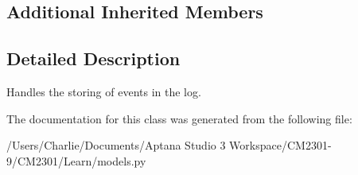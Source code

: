 \subsection*{Additional Inherited Members}


\subsection{Detailed Description}
Handles the storing of events in the log. 

The documentation for this class was generated from the following file\-:\begin{DoxyCompactItemize}
\item 
/\-Users/\-Charlie/\-Documents/\-Aptana Studio 3 Workspace/\-C\-M2301-\/9/\-C\-M2301/\-Learn/models.\-py\end{DoxyCompactItemize}
